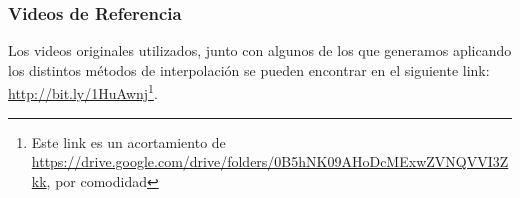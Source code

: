 
\newpage

\subsubsection{Videos de Referencia}
\label{sec:links}

Los videos originales utilizados, junto con algunos de los que generamos aplicando los distintos métodos de interpolación se pueden encontrar en el siguiente link: \url{http://bit.ly/1HuAwnj}\footnote{Este link es un acortamiento de \newline \url{https://drive.google.com/drive/folders/0B5hNK09AHoDcMExwZVNQVVI3Zkk}, por comodidad}.

\printbibliography


